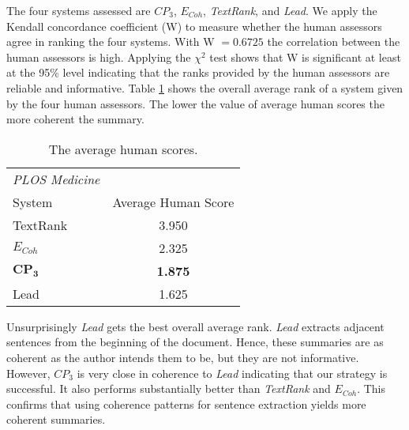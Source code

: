 The four systems assessed are
\emph{$CP_3$}, \emph{$E_{Coh}$}, \emph{Text\-Rank}, and \emph{Lead}.
We apply the Kendall concordance coefficient (W) \cite{siegel88} to measure whether the human assessors agree in ranking the four systems. With W $= 0.6725$ the correlation between the human assessors is high. Applying the $\chi^2$ test shows that W is significant at least at the 95\% level indicating that the ranks provided by the human assessors are reliable and informative.
Table \ref{tab:3} shows the overall average rank of a system given by the four human assessors. The lower the value of average human scores the more coherent the summary.
\begin{table}[!ht]
\centering
\small
\begin{tabular}{@{}l|c}
\emph{PLOS Medicine}\\
System &  Average Human Score\\
\hline
TextRank & 3.950\\
$E_{Coh}$ & 2.325\\
$\mathbf{CP_3}$ & \textbf{1.875} \\
Lead & 1.625\\
\hline
\end{tabular}
\caption{The average human scores.}
\label{tab:3}
\end{table}
%
Unsurprisingly \emph{Lead} gets the best overall average rank. \emph{Lead} extracts adjacent sentences from the beginning of the document. Hence, these summaries are as coherent as the author intends them to be, but they are not informative.
However, \emph{$CP_3$} is very close in coherence to \emph{Lead} indicating that our strategy is successful. It also performs substantially better than \emph{Text\-Rank} and \emph{$E_{Coh}$}.
This confirms that using coherence patterns for sentence extraction yields more coherent summaries.
 


